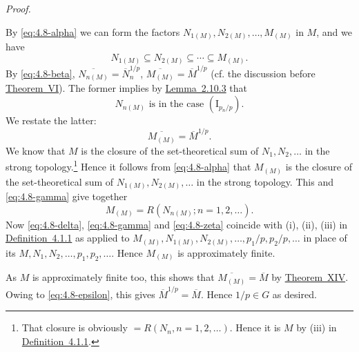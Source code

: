 \documentclass[b5paper,twoside]{article}
\newcommand{\thmref}[2]{\hyperref[#1]{\mbox{Theorem~#2}}}
\newcommand{\lemref}[2]{\hyperref[#1]{\mbox{Lemma~#2}}}
\newcommand{\defref}[2]{\hyperref[#1]{\mbox{Definition~#2}}}
\theoremstyle{mvnplain}
\renewenvironment{proof}[1][Proof]{%
  \par\addvspace{0.35\baselineskip}%
  \noindent\textit{#1.}\ \normalfont\ignorespaces
}{%
  \par\addvspace{0.35\baselineskip}%
}
\newcommand{\M}{\mathbf M}
\newcommand{\N}{\mathbf N}
\newcommand{\R}{\mathbf R}
\def\M{M}%
\def\N{N}%
\def\R{R}%
\def\mathfrak#1{#1}%
\begin{document}
\begin{proof}
By \eqref{eq:4.8-alpha} we can form the factors
\(\N_{1(\mathfrak M)},\N_{2(\mathfrak M)},\ldots,\M_{(\mathfrak M)}\) in
\(\mathfrak M\), and we have
\begin{equation}\tag{4.8.\(\gamma\)}\label{eq:4.8-gamma}
 \N_{1(\mathfrak M)}\subseteq\N_{2(\mathfrak M)}\subseteq\cdots
 \subseteq\M_{(\mathfrak M)}.
\end{equation}
By \eqref{eq:4.8-beta},
\(\overline{\N_{n(\mathfrak M)}}=\overline{\N}_n^{1/p}\),
\(\overline{\M_{(\mathfrak M)}}=\overline{\M}^{1/p}\) (cf. the discussion
before \thmref{thm:VI}{VI}). The former implies by
\lemref{lem:2.10.3}{2.10.3} that
\begin{equation}\tag{4.8.\(\delta\)}\label{eq:4.8-delta}
 \N_{n(\mathfrak M)}\text{ is in the case }(\mathrm I_{p_n/p}).
\end{equation}
We restate the latter:
\begin{equation}\tag{4.8.\(\epsilon\)}\label{eq:4.8-epsilon}
 \overline{\M_{(\mathfrak M)}}=\overline{\M}^{1/p}.
\end{equation}
We know that \(\M\) is the closure of the set-theoretical sum of
\(\N_1,\N_2,\ldots\) in the strong topology.\footnote{That closure is
obviously \(=\R(\N_n,n=1,2,\ldots)\). Hence it is \(\M\) by (iii) in
\defref{def:4.1.1}{4.1.1}.} Hence it follows from \eqref{eq:4.8-alpha} that
\(\M_{(\mathfrak M)}\) is the closure of the set-theoretical sum of
\(\N_{1(\mathfrak M)},\N_{2(\mathfrak M)},\ldots\) in the strong topology.
This and \eqref{eq:4.8-gamma} give together
\begin{equation}\tag{4.8.\(\zeta\)}\label{eq:4.8-zeta}
 \M_{(\mathfrak M)}=\R(\N_{n(\mathfrak M)};n=1,2,\ldots).
\end{equation}
Now \eqref{eq:4.8-delta}, \eqref{eq:4.8-gamma} and
\eqref{eq:4.8-zeta} coincide with (i), (ii), (iii) in
\defref{def:4.1.1}{4.1.1} as applied to
\(\M_{(\mathfrak M)},\allowbreak\N_{1(\mathfrak M)},\allowbreak
\N_{2(\mathfrak M)},\allowbreak\ldots,\allowbreak
p_1/p,\allowbreak p_2/p,\allowbreak\ldots\) in place of its
\(\M,\allowbreak\N_1,\allowbreak\N_2,\allowbreak\ldots,\allowbreak
p_1,\allowbreak p_2,\allowbreak\ldots\). Hence \(\M_{(\mathfrak M)}\) is
approximately finite.

As \(\M\) is approximately finite too, this shows that
\(\overline{\M_{(\mathfrak M)}}=\overline{\M}\) by
\thmref{thm:XIV}{XIV}. Owing to \eqref{eq:4.8-epsilon}, this gives
\(\overline{\M}^{1/p}=\overline{\M}\). Hence
\(1/p\in\mathfrak G\) as desired.
\end{proof}
\end{document}
